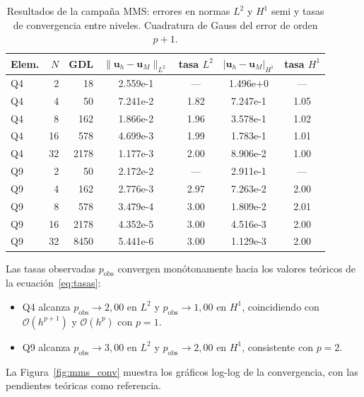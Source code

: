 \begin{table}[H]
  \centering
  \caption{Resultados de la campaña MMS: errores en normas $L^2$ y $H^1$
           semi y tasas de convergencia entre niveles. Cuadratura de Gauss
           del error de orden $p+1$.}
  \label{tab:mms}
  \begin{tabular}{l r r S[table-format=1.3e1] S[table-format=1.2] S[table-format=1.3e1] S[table-format=1.2]}
    \toprule
    Elem. & $N$ & GDL &
      {$\|\mathbf{u}_h-\mathbf{u}_M\|_{L^2}$} & {tasa $L^2$} &
      {$|\mathbf{u}_h-\mathbf{u}_M|_{H^1}$} & {tasa $H^1$} \\
    \midrule
    Q4  &  2 &   18 & 2.559e-1 & {---} & 1.496e+0 & {---} \\
    Q4  &  4 &   50 & 7.241e-2 & 1.82 & 7.247e-1 & 1.05 \\
    Q4  &  8 &  162 & 1.866e-2 & 1.96 & 3.578e-1 & 1.02 \\
    Q4  & 16 &  578 & 4.699e-3 & 1.99 & 1.783e-1 & 1.01 \\
    Q4  & 32 & 2178 & 1.177e-3 & 2.00 & 8.906e-2 & 1.00 \\
    \midrule
    Q9  &  2 &   50 & 2.172e-2 & {---} & 2.911e-1 & {---} \\
    Q9  &  4 &  162 & 2.776e-3 & 2.97 & 7.263e-2 & 2.00 \\
    Q9  &  8 &  578 & 3.479e-4 & 3.00 & 1.809e-2 & 2.01 \\
    Q9  & 16 & 2178 & 4.352e-5 & 3.00 & 4.516e-3 & 2.00 \\
    Q9  & 32 & 8450 & 5.441e-6 & 3.00 & 1.129e-3 & 2.00 \\
    \bottomrule
  \end{tabular}
\end{table}

Las tasas observadas $p_{\mathrm{obs}}$ convergen monótonamente hacia los
valores teóricos de la ecuación~\eqref{eq:tasas}:

\begin{itemize}
  \item Q4 alcanza $p_{\mathrm{obs}} \to 2{,}00$ en $L^2$ y $p_{\mathrm{obs}} \to 1{,}00$ en $H^1$,
        coincidiendo con $\mathcal{O}(h^{p+1})$ y $\mathcal{O}(h^p)$ con $p=1$.
  \item Q9 alcanza $p_{\mathrm{obs}} \to 3{,}00$ en $L^2$ y $p_{\mathrm{obs}} \to 2{,}00$ en $H^1$,
        consistente con $p=2$.
\end{itemize}

\noindent La Figura~\ref{fig:mms_conv} muestra los gráficos log-log de la
convergencia, con las pendientes teóricas como referencia.

